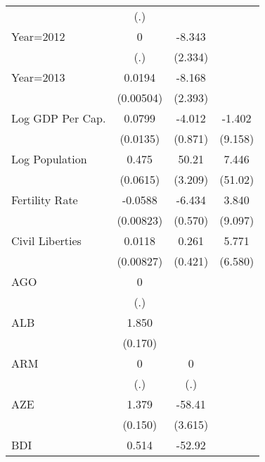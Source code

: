 \begin{table}[htbp]
\begin{tabular}{l*{3}{c}}
                &      (.)         &                  &                  \\
\addlinespace
Year=2012       &        0         &   -8.343\sym{***}&                  \\
                &      (.)         &  (2.334)         &                  \\
\addlinespace
Year=2013       &   0.0194\sym{***}&   -8.168\sym{***}&                  \\
                &(0.00504)         &  (2.393)         &                  \\
\addlinespace
Log GDP Per Cap.&   0.0799\sym{***}&   -4.012\sym{***}&   -1.402         \\
                & (0.0135)         &  (0.871)         &  (9.158)         \\
\addlinespace
Log Population  &    0.475\sym{***}&    50.21\sym{***}&    7.446         \\
                & (0.0615)         &  (3.209)         &  (51.02)         \\
\addlinespace
Fertility Rate  &  -0.0588\sym{***}&   -6.434\sym{***}&    3.840         \\
                &(0.00823)         &  (0.570)         &  (9.097)         \\
\addlinespace
Civil Liberties &   0.0118         &    0.261         &    5.771         \\
                &(0.00827)         &  (0.421)         &  (6.580)         \\
\addlinespace
AGO             &        0         &                  &                  \\
                &      (.)         &                  &                  \\
\addlinespace
ALB             &    1.850\sym{***}&                  &                  \\
                &  (0.170)         &                  &                  \\
\addlinespace
ARM             &        0         &        0         &                  \\
                &      (.)         &      (.)         &                  \\
\addlinespace
AZE             &    1.379\sym{***}&   -58.41\sym{***}&                  \\
                &  (0.150)         &  (3.615)         &                  \\
\addlinespace
BDI             &    0.514\sym{***}&   -52.92\sym{***}&                  \\

\end{tabular}
\end{table}
